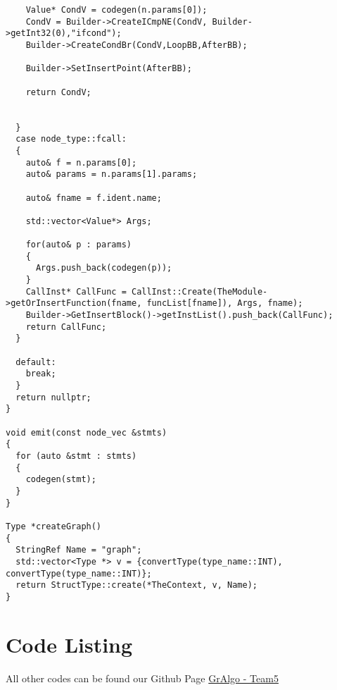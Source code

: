 \documentclass[english,a4paper,12pt]{report}
\begin{document}
\begin{lstlisting}
    Value* CondV = codegen(n.params[0]);
    CondV = Builder->CreateICmpNE(CondV, Builder->getInt32(0),"ifcond");
    Builder->CreateCondBr(CondV,LoopBB,AfterBB);

    Builder->SetInsertPoint(AfterBB);

    return CondV;
    

  }
  case node_type::fcall:
  {
    auto& f = n.params[0];
    auto& params = n.params[1].params;

    auto& fname = f.ident.name;

    std::vector<Value*> Args;

    for(auto& p : params)
    {
      Args.push_back(codegen(p));
    }
    CallInst* CallFunc = CallInst::Create(TheModule->getOrInsertFunction(fname, funcList[fname]), Args, fname);
    Builder->GetInsertBlock()->getInstList().push_back(CallFunc);
    return CallFunc;
  }
 
  default:
    break;
  }
  return nullptr;
}

void emit(const node_vec &stmts)
{
  for (auto &stmt : stmts)
  {
    codegen(stmt);
  }
}

Type *createGraph()
{
  StringRef Name = "graph";
  std::vector<Type *> v = {convertType(type_name::INT), convertType(type_name::INT)};
  return StructType::create(*TheContext, v, Name);
}

\end{lstlisting}

\section{Code Listing}
All other codes can be found our Github Page \href{https://github.com/IITH-COMPILERS2/compilers-2-project-team-5-aug22}{GrAlgo - Team5} 
\end{document}
